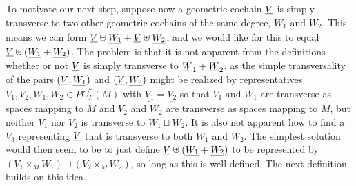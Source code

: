 \begin{comment}
	\subsubsection{Chain and cochains transversality and products}\label{S: trans products}
\end{comment}

To motivate our next step, suppose now a geometric cochain $\underline{V}$ is simply transverse to two other geometric cochains of the same degree, $\underline{W_1}$ and $\underline{W_2}$.
This means we can form $\underline{V}\uplus \underline{W_1}+\underline{V}\uplus \underline{W_2}$, and we would like for this to equal $\underline{V}\uplus (\underline{W_1} + \underline{W_2})$.
The problem is that it is not apparent from the definitions whether or not $\underline{V}$ is simply transverse to $\underline{W}_1+\underline{W}_2$, as the simple transversality of the pairs $(\underline{V},\underline{W_1})$ and $(\underline{V},\underline{W_2})$ might be realized by representatives $V_1,V_2, W_1,W_2 \in PC^*_\Gamma(M)$ with $\underline{V_1} = \underline{V_2}$ so that $V_1$ and $W_1$ are transverse as spaces mapping to $M$ and $V_2$ and $W_2$ are transverse as spaces mapping to $M$, but neither $V_1$ nor $V_2$ is transverse to $W_1 \sqcup W_2$.
It is also not apparent how to find a $V_3$ representing $\underline{V}$ that is transverse to both $W_1$ and $W_2$.
The simplest solution would then seem to be to just define
$\underline{V}\uplus (\underline{W_1}+\underline{W_2})$ to be represented by $(V_1 \times_M W_1) \sqcup (V_2 \times_M W_2)$, so long as this is well defined.
The next definition builds on this idea.

